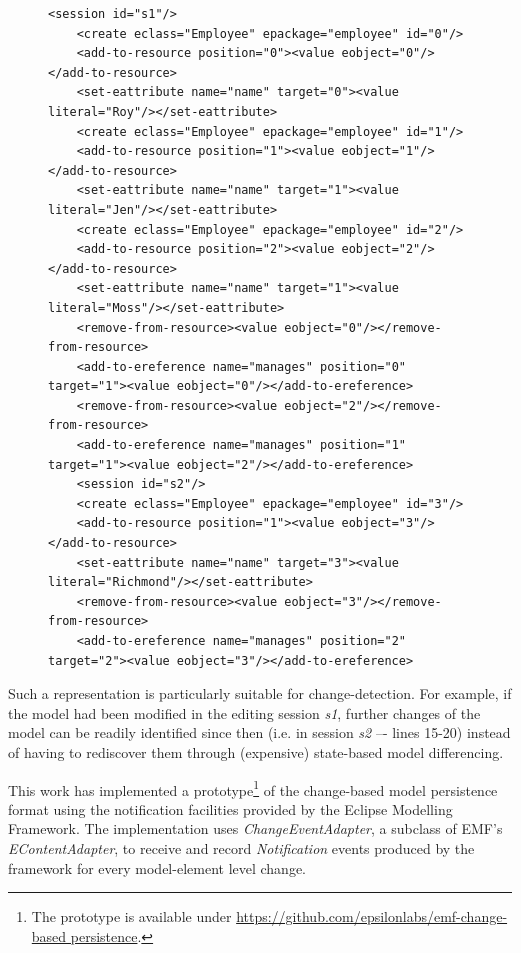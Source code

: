 \documentclass[12pt, a4paper]{report} \usepackage[titletoc]{appendix}
\begin{document}
\begin{figure}[h]
	\begin{lstlisting}[style=xml,caption={Change-based representation of the model of Figure \ref{fig:modified_chart}.},label=lst:change-based persistencemodel_0]
	<session id="s1"/>
	<create eclass="Employee" epackage="employee" id="0"/>
	<add-to-resource position="0"><value eobject="0"/></add-to-resource>
	<set-eattribute name="name" target="0"><value literal="Roy"/></set-eattribute>
	<create eclass="Employee" epackage="employee" id="1"/>
	<add-to-resource position="1"><value eobject="1"/></add-to-resource>
	<set-eattribute name="name" target="1"><value literal="Jen"/></set-eattribute>
	<create eclass="Employee" epackage="employee" id="2"/>
	<add-to-resource position="2"><value eobject="2"/></add-to-resource>
	<set-eattribute name="name" target="1"><value literal="Moss"/></set-eattribute>
	<remove-from-resource><value eobject="0"/></remove-from-resource>
	<add-to-ereference name="manages" position="0" target="1"><value eobject="0"/></add-to-ereference>
	<remove-from-resource><value eobject="2"/></remove-from-resource>
	<add-to-ereference name="manages" position="1" target="1"><value eobject="2"/></add-to-ereference>
	<session id="s2"/>
	<create eclass="Employee" epackage="employee" id="3"/>
	<add-to-resource position="1"><value eobject="3"/></add-to-resource>
	<set-eattribute name="name" target="3"><value literal="Richmond"/></set-eattribute>
	<remove-from-resource><value eobject="3"/></remove-from-resource>
	<add-to-ereference name="manages" position="2" target="2"><value eobject="3"/></add-to-ereference>
	\end{lstlisting}
\end{figure}

Such a representation is particularly suitable for change-detection. For example, if the model had been modified in the editing session \emph{s1}, further changes of the model can be readily identified since then (i.e. in session \emph{s2} –- lines 15-20) instead of having to rediscover them through (expensive) state-based model differencing.

This work has implemented a prototype\footnote{The prototype is available under \url{https://github.com/epsilonlabs/emf-change-based persistence}.} of the change-based model persistence format using the notification facilities provided by the Eclipse Modelling Framework. The implementation uses \emph{ChangeEventAdapter}, a subclass of EMF's \emph{EContentAdapter}, to receive and record \emph{Notification} events produced by the framework for every model-element level change.
\end{document}

